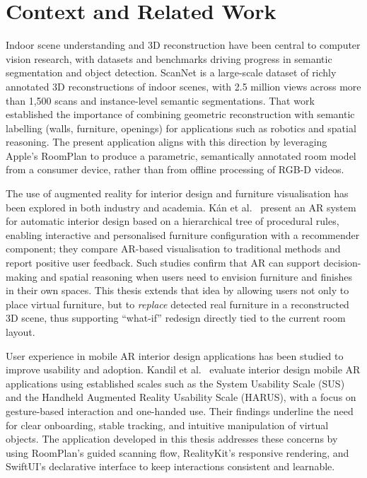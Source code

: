 \documentclass[12pt]{report}
\begin{document}
\newpage
{}

\section*{Context and Related Work}

Indoor scene understanding and 3D reconstruction have been central to computer vision research, with datasets and benchmarks driving progress in semantic segmentation and object detection. ScanNet \cite{dai2017scannet} is a large-scale dataset of richly annotated 3D reconstructions of indoor scenes, with 2.5 million views across more than 1,500 scans and instance-level semantic segmentations. That work established the importance of combining geometric reconstruction with semantic labelling (walls, furniture, openings) for applications such as robotics and spatial reasoning. The present application aligns with this direction by leveraging Apple's RoomPlan to produce a parametric, semantically annotated room model from a consumer device, rather than from offline processing of RGB-D videos.

The use of augmented reality for interior design and furniture visualisation has been explored in both industry and academia. K\'an et al.\ \cite{kan2021ar} present an AR system for automatic interior design based on a hierarchical tree of procedural rules, enabling interactive and personalised furniture configuration with a recommender component; they compare AR-based visualisation to traditional methods and report positive user feedback. Such studies confirm that AR can support decision-making and spatial reasoning when users need to envision furniture and finishes in their own spaces. This thesis extends that idea by allowing users not only to place virtual furniture, but to \emph{replace} detected real furniture in a reconstructed 3D scene, thus supporting ``what-if'' redesign directly tied to the current room layout.

User experience in mobile AR interior design applications has been studied to improve usability and adoption. Kandil et al.\ \cite{kandil2021ux} evaluate interior design mobile AR applications using established scales such as the System Usability Scale (SUS) and the Handheld Augmented Reality Usability Scale (HARUS), with a focus on gesture-based interaction and one-handed use. Their findings underline the need for clear onboarding, stable tracking, and intuitive manipulation of virtual objects. The application developed in this thesis addresses these concerns by using RoomPlan's guided scanning flow, RealityKit's responsive rendering, and SwiftUI's declarative interface to keep interactions consistent and learnable.
\end{document}
